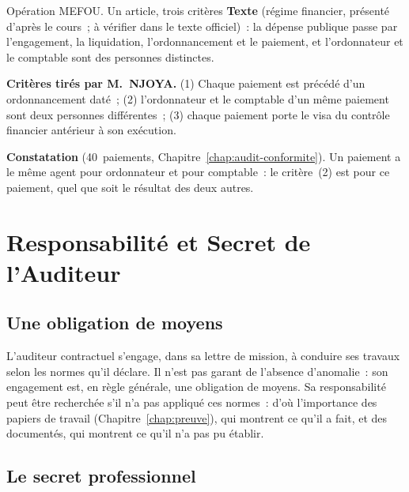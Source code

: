 \begin{boxscenario}{Opération MEFOU. Un article, trois critères}
\textbf{Texte} (régime financier, présenté d'après le cours~; à vérifier
dans le texte officiel)~: la dépense publique passe par l'engagement, la
liquidation, l'ordonnancement et le paiement, et l'ordonnateur et le
comptable sont des personnes distinctes.

\medskip
\textbf{Critères tirés par M.~NJOYA.} (1) Chaque paiement est précédé d'un
ordonnancement daté~; (2) l'ordonnateur et le comptable d'un même paiement
sont deux personnes différentes~; (3) chaque paiement porte le visa du
contrôle financier antérieur à son exécution.

\medskip
\textbf{Constatation} (40~paiements, Chapitre~\ref{chap:audit-conformite}).
Un paiement a le même agent pour ordonnateur et pour comptable~: le
critère~(2) est \NON{} pour ce paiement, quel que soit le résultat des deux
autres.
\end{boxscenario}

\section{Responsabilité et Secret de l'Auditeur}
\label{sec:c15-responsabilite}

\subsection{Une obligation de moyens}

L'auditeur contractuel s'engage, dans sa lettre de mission, à conduire ses
travaux selon les normes qu'il déclare. Il n'est pas garant de l'absence
d'anomalie~: son engagement est, en règle générale, une obligation de
moyens. Sa responsabilité peut être recherchée s'il n'a pas appliqué ces
normes~: d'où l'importance des papiers de travail
(Chapitre~\ref{chap:preuve}), qui montrent ce qu'il a fait, et des \NEK{}
documentés, qui montrent ce qu'il n'a pas pu établir.

\subsection{Le secret professionnel}

